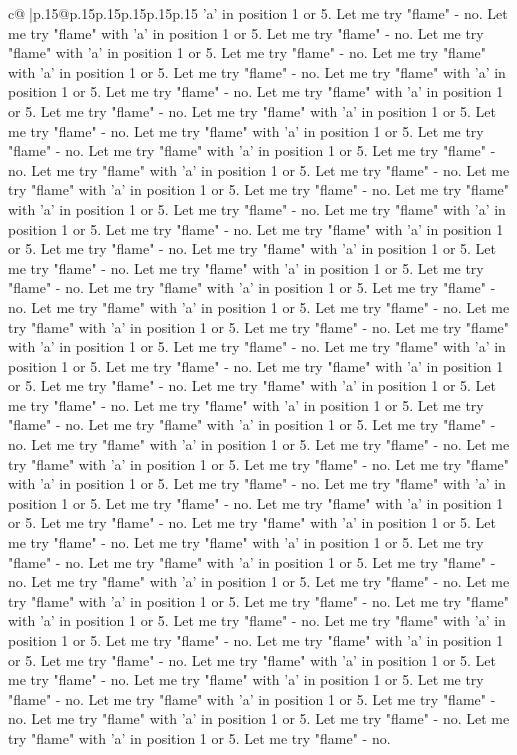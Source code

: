 \documentclass{article}
\begin{document}
{\begin{supertabular}{c@{$\;$}|p{.15\linewidth}@{}p{.15\linewidth}p{.15\linewidth}p{.15\linewidth}p{.15\linewidth}p{.15\linewidth}}
{{{'a' in position 1 or 5. Let me try "flame" {-} no. Let me try "flame" with 'a' in position 1 or 5. Let me try "flame" {-} no. Let me try "flame" with 'a' in position 1 or 5. Let me try "flame" {-} no. Let me try "flame" with 'a' in position 1 or 5. Let me try "flame" {-} no. Let me try "flame" with 'a' in position 1 or 5. Let me try "flame" {-} no. Let me try "flame" with 'a' in position 1 or 5. Let me try "flame" {-} no. Let me try "flame" with 'a' in position 1 or 5. Let me try "flame" {-} no. Let me try "flame" with 'a' in position 1 or 5. Let me try "flame" {-} no. Let me try "flame" with 'a' in position 1 or 5. Let me try "flame" {-} no. Let me try "flame" with 'a' in position 1 or 5. Let me try "flame" {-} no. Let me try "flame" with 'a' in position 1 or 5. Let me try "flame" {-} no. Let me try "flame" with 'a' in position 1 or 5. Let me try "flame" {-} no. Let me try "flame" with 'a' in position 1 or 5. Let me try "flame" {-} no. Let me try "flame" with 'a' in position 1 or 5. Let me try "flame" {-} no. Let me try "flame" with 'a' in position 1 or 5. Let me try "flame" {-} no. Let me try "flame" with 'a' in position 1 or 5. Let me try "flame" {-} no. Let me try "flame" with 'a' in position 1 or 5. Let me try "flame" {-} no. Let me try "flame" with 'a' in position 1 or 5. Let me try "flame" {-} no. Let me try "flame" with 'a' in position 1 or 5. Let me try "flame" {-} no. Let me try "flame" with 'a' in position 1 or 5. Let me try "flame" {-} no. Let me try "flame" with 'a' in position 1 or 5. Let me try "flame" {-} no. Let me try "flame" with 'a' in position 1 or 5. Let me try "flame" {-} no. Let me try "flame" with 'a' in position 1 or 5. Let me try "flame" {-} no. Let me try "flame" with 'a' in position 1 or 5. Let me try "flame" {-} no. Let me try "flame" with 'a' in position 1 or 5. Let me try "flame" {-} no. Let me try "flame" with 'a' in position 1 or 5. Let me try "flame" {-} no. Let me try "flame" with 'a' in position 1 or 5. Let me try "flame" {-} no. Let me try "flame" with 'a' in position 1 or 5. Let me try "flame" {-} no. Let me try "flame" with 'a' in position 1 or 5. Let me try "flame" {-} no. Let me try "flame" with 'a' in position 1 or 5. Let me try "flame" {-} no. Let me try "flame" with 'a' in position 1 or 5. Let me try "flame" {-} no. Let me try "flame" with 'a' in position 1 or 5. Let me try "flame" {-} no. Let me try "flame" with 'a' in position 1 or 5. Let me try "flame" {-} no. Let me try "flame" with 'a' in position 1 or 5. Let me try "flame" {-} no. Let me try "flame" with 'a' in position 1 or 5. Let me try "flame" {-} no. Let me try "flame" with 'a' in position 1 or 5. Let me try "flame" {-} no. Let me try "flame" with 'a' in position 1 or 5. Let me try "flame" {-} no. Let me try "flame" with 'a' in position 1 or 5. Let me try "flame" {-} no. Let me try "flame" with 'a' in position 1 or 5. Let me try "flame" {-} no. Let me try "flame" with 'a' in position 1 or 5. Let me try "flame" {-} no. Let me try "flame" with 'a' in position 1 or 5. Let me try "flame" {-} no. Let me try "flame" with 'a' in position 1 or 5. Let me try "flame" {-} no. Let me try "flame" with 'a' in position 1 or 5. Let me try "flame" {-} no. }}}
\end{supertabular}}
\end{document}

